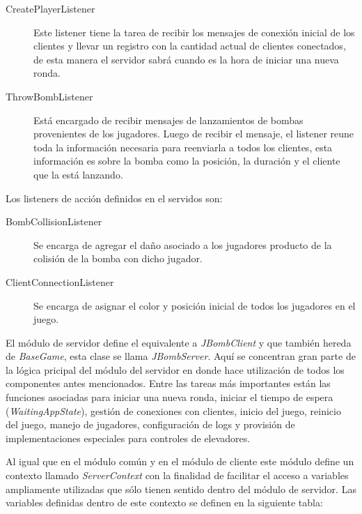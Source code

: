 \documentclass[a4paper,12pt,openany,oneside]{book}
\begin{document}
\begin{description}
\item[CreatePlayerListener] Este listener tiene la tarea de recibir los mensajes de conexión inicial de los clientes y llevar un registro con la cantidad actual de clientes conectados, de esta manera el servidor sabrá cuando es la hora de iniciar una nueva ronda.
\item[ThrowBombListener] Está encargado de recibir mensajes de lanzamientos de bombas provenientes de los jugadores. Luego de recibir el mensaje, el listener reune toda la información necesaria para reenviarla a todos los clientes, esta información es sobre la bomba como la posición, la duración y el cliente que la está lanzando.
\end{description}
Los listeners de acción definidos en el servidos son:
\begin{description}
\item[BombCollisionListener] Se encarga de agregar el daño asociado a los jugadores producto de la colisión de la bomba con dicho jugador.
\item[ClientConnectionListener] Se encarga de asignar el color y posición inicial de todos los jugadores en el juego.
\end{description}
El módulo de servidor define el equivalente a \textit{JBombClient} y que también hereda de \textit{BaseGame}, esta clase se llama \textit{JBombServer}. Aquí se concentran gran parte de la lógica pricipal del módulo del servidor en donde hace utilización de todos los componentes antes mencionados. Entre las tareas más importantes están las funciones asociadas para iniciar una nueva ronda, iniciar el tiempo de espera (\textit{WaitingAppState}), gestión de conexiones con clientes, inicio del juego, reinicio del juego, manejo de jugadores, configuración de logs y provisión de implementaciones especiales para controles de elevadores.

Al igual que en el módulo común y en el módulo de cliente este módulo define un contexto llamado \textit{ServerContext} con la finalidad de facilitar el acceso a variables ampliamente utilizadas que sólo tienen sentido dentro del módulo de servidor. Las variables definidas dentro de este contexto se definen en la siguiente tabla:
\end{document}
